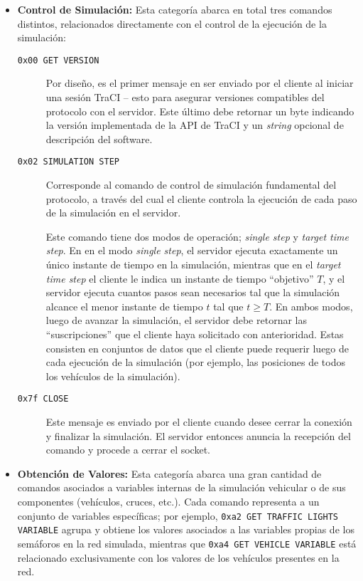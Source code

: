 \begin{itemize}
    \item \textbf{Control de Simulación:} Esta categoría abarca en total tres comandos distintos, relacionados directamente con el control de la ejecución de la simulación:
    
    \begin{description}
        \item [\texttt{0x00 GET VERSION}] Por diseño, es el primer mensaje en ser enviado por el cliente al iniciar una sesión TraCI -- esto para asegurar versiones compatibles del protocolo con el servidor. Este último debe retornar un byte indicando la versión implementada de la API de TraCI y un \emph{string} opcional de descripción del software.
        
        \item [\texttt{0x02 SIMULATION STEP}] Corresponde al comando de control de simulación fundamental del protocolo, a través del cual el cliente controla la ejecución de cada paso de la simulación en el servidor.
        
        Este comando tiene dos modos de operación; \emph{single step} y \emph{target time step}. En en el modo \emph{single step}, el servidor ejecuta exactamente un único instante de tiempo en la simulación, mientras que en el \emph{target time step} el cliente le indica un instante de tiempo ``objetivo'' $T$, y el servidor ejecuta cuantos pasos sean necesarios tal que la simulación alcance el menor instante de tiempo $t$ tal que $t \geq T$. En ambos modos, luego de avanzar la simulación, el servidor debe retornar las ``suscripciones'' que el cliente haya solicitado con anterioridad. Estas consisten en conjuntos de datos que el cliente puede requerir luego de cada ejecución de la simulación (por ejemplo, las posiciones de todos los vehículos de la simulación).
        
        \item [\texttt{0x7f CLOSE}] Este mensaje es enviado por el cliente cuando desee cerrar la conexión y finalizar la simulación. El servidor entonces anuncia la recepción del comando y procede a cerrar el socket.
    \end{description}
    
    \item \textbf{Obtención de Valores:} Esta categoría abarca una gran cantidad de comandos asociados a variables internas de la simulación vehicular o de sus componentes (vehículos, cruces, etc.). Cada comando representa a un conjunto de variables específicas; por ejemplo, \texttt{0xa2 GET TRAFFIC LIGHTS VARIABLE} agrupa y obtiene los valores asociados a las variables propias de los semáforos en la red simulada, mientras que \texttt{0xa4 GET VEHICLE VARIABLE} está relacionado exclusivamente con los valores de los vehículos presentes en la red.
    

\end{itemize}
